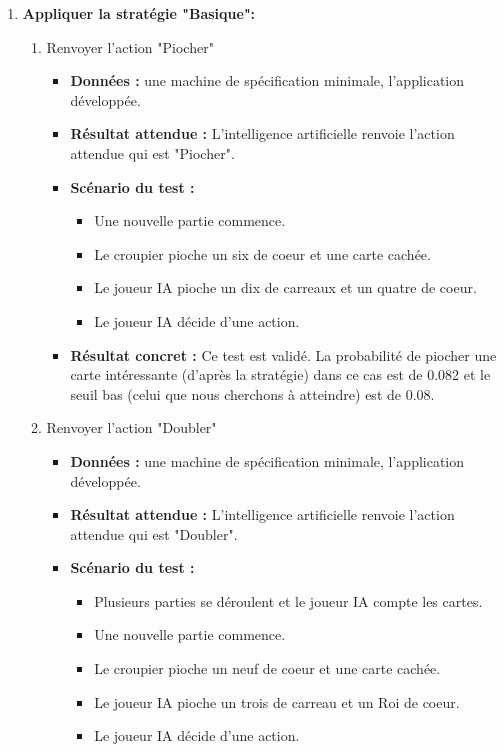 \begin{enumerate}
    \item \textbf{Appliquer la stratégie "Basique":} 
    \begin{enumerate}
        \item Renvoyer l'action "Piocher"
        \begin{itemize}
            \item \textbf{Données :} une machine de spécification minimale, l'application développée.
            \item \textbf{Résultat attendue :} L'intelligence artificielle renvoie l'action attendue qui est "Piocher".
            \item \textbf{Scénario du test :}
            \begin{itemize}
                \item Une nouvelle partie commence.
                \item Le croupier pioche un six de coeur et une carte cachée.
                \item Le joueur IA pioche un dix de carreaux et un quatre de coeur.
                \item Le joueur IA décide d'une action.
            \end{itemize}
            
            \item \textbf{Résultat concret : } Ce test est validé. La probabilité de piocher une carte intéressante (d'après la stratégie) dans ce cas est de 0.082 et le seuil bas (celui que nous cherchons à atteindre) est de 0.08.
        \end{itemize}

        \item Renvoyer l'action "Doubler"
        \begin{itemize}
            \item \textbf{Données :} une machine de spécification minimale, l'application développée.
            \item \textbf{Résultat attendue :} L'intelligence artificielle renvoie l'action attendue qui est "Doubler".
            \item \textbf{Scénario du test :}
            \begin{itemize}
                \item Plusieurs parties se déroulent et le joueur IA compte les cartes.
                \item Une nouvelle partie commence.
                \item Le croupier pioche un neuf de coeur et une carte cachée.
                \item Le joueur IA pioche un trois de carreau et un Roi de coeur.
                \item Le joueur IA décide d'une action.
            \end{itemize}
            

\end{itemize}
\end{enumerate}
\end{enumerate}
